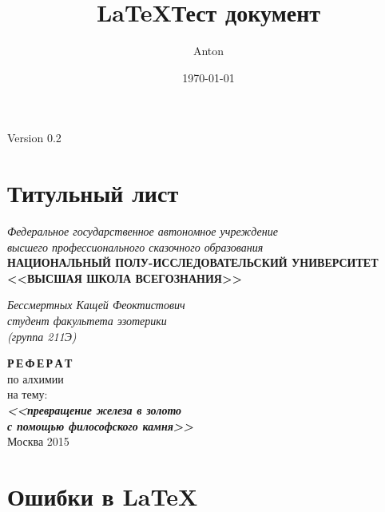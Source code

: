 \documentclass[a4paper,12pt]{article}%
\author{Anton}
\title{\LaTeX Тест документ}
\date{\today}%
\theoremstyle{plain}%
\theoremstyle{definition}%
\theoremstyle{remark}%
\begin{document}

\maketitle%
\begin{center}
Version 0.2
\end{center}



\section{Титульный лист}

\newpage%
\thispagestyle{empty}%

\begin{center}
\textit{Федеральное государственное автономное учреждение \\ высшего профессионального сказочного образования} \\
\vspace{0.5ex}
%
\textbf{НАЦИОНАЛЬНЫЙ ПОЛУ-ИССЛЕДОВАТЕЛЬСКИЙ УНИВЕРСИТЕТ \\ <<ВЫСШАЯ ШКОЛА ВСЕГОЗНАНИЯ>>}
\end{center}

\vspace{13ex}

\begin{flushright}%
\noindent%
\textit{Бессмертных Кащей Феоктистович} \\
%
\textit{студент факультета эзотерики \\ (группа 211Э)}
\end{flushright}

\begin{center}
\vspace{13ex}
\textbf{Р\,Е\,Ф\,Е\,Р\,А\,Т}\\
\vspace{1ex}
по алхимии \\
на тему: \\
\textbf{\textit{<<превращение железа в золото \\
с помощью философского камня>>}} \\
\vfill%
Москва 2015
\end{center}

\newpage


\section{Ошибки в \LaTeX}
\end{document}
